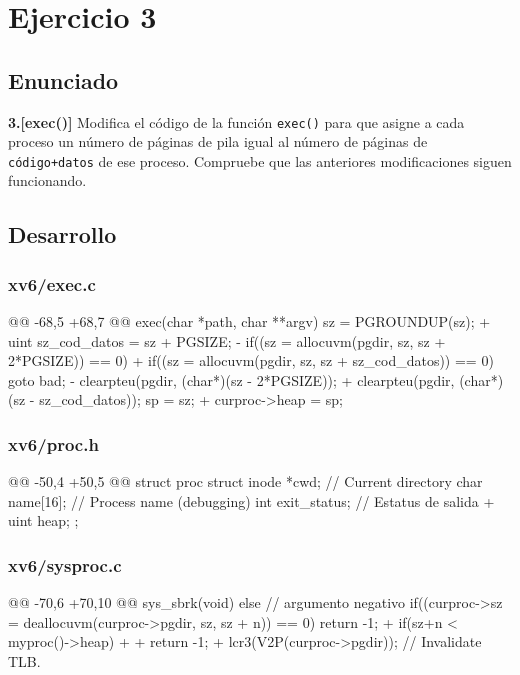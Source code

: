 \section{Ejercicio 3}

\subsection{Enunciado}
\begin{ejer}
    \textbf{3.[exec()]} Modifica el código de la función \texttt{exec()} para que asigne 
    a cada proceso un número de páginas de pila igual al número de páginas de \texttt{código+datos} 
    de ese proceso. Compruebe que las anteriores modificaciones siguen funcionando.
\end{ejer}

\subsection{Desarrollo}

\subsubsection{xv6/exec.c}
\begin{listing}
@@ -68,5 +68,7 @@ exec(char *path, char **argv)
    sz = PGROUNDUP(sz);
+   uint sz_cod_datos = sz + PGSIZE;
-   if((sz = allocuvm(pgdir, sz, sz + 2*PGSIZE)) == 0)    
+   if((sz = allocuvm(pgdir, sz, sz + sz_cod_datos)) == 0)
        goto bad;
-   clearpteu(pgdir, (char*)(sz - 2*PGSIZE));
+   clearpteu(pgdir, (char*)(sz - sz_cod_datos));
    sp = sz;
+   curproc->heap = sp;
\end{listing}

\subsubsection{xv6/proc.h}
\begin{listing}
@@ -50,4 +50,5 @@ struct proc {
        struct inode *cwd;           // Current directory
        char name[16];               // Process name (debugging)
        int exit_status;             // Estatus de salida
+       uint heap;   
    };
\end{listing}

\subsubsection{xv6/sysproc.c}
\begin{listing}
@@ -70,6 +70,10 @@ sys_sbrk(void)
    else // argumento negativo
    {
        if((curproc->sz = deallocuvm(curproc->pgdir, sz, sz + n)) == 0)
            return -1;
+       if(sz+n < myproc()->heap)
+       {
+           return -1;
+       }
    }
    lcr3(V2P(curproc->pgdir));  // Invalidate TLB.
\end{listing}
